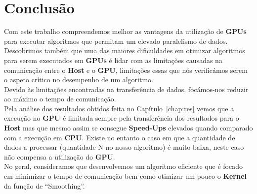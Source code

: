 \chapter{Conclusão}
Com este trabalho compreendemos melhor as vantagens da utilização de \textbf{GPUs} para executar algoritmos que permitam um elevado paralelismo de dados. Descobrimos também que uma das maiores dificuldades em otimizar algoritmos para serem executados em \textbf{GPUs} é lidar com as limitações causadas na comunicação entre o \textbf{Host} e o \textbf{GPU}, limitações essas que nós verificámos serem o aspeto crítico no desempenho de um algoritmo.\\

Devido às limitações encontradas na transferência de dados, focámos-nos reduzir ao máximo o tempo de comunicação.\\

Pela análise dos resultados obtidos feita no Capítulo~\ref{chap:res} vemos que a execução no \textbf{GPU} é limitada sempre pela transferência dos resultados para o \textbf{Host} mas que mesmo assim se consegue \textbf{Speed-Ups} elevados quando comparado com a execução em \textbf{CPU}. Existe no entanto o caso em que a quantidade de dados a processar (quantidade N no nosso algoritmo) é muito baixa, neste caso não compensa a utilização do \textbf{GPU}.\\

No geral, consideramos que desenvolvemos um algoritmo eficiente que é focado em minimizar o tempo de comunicação bem como otimizar um pouco o \textbf{Kernel} da função de ``Smoothing''.